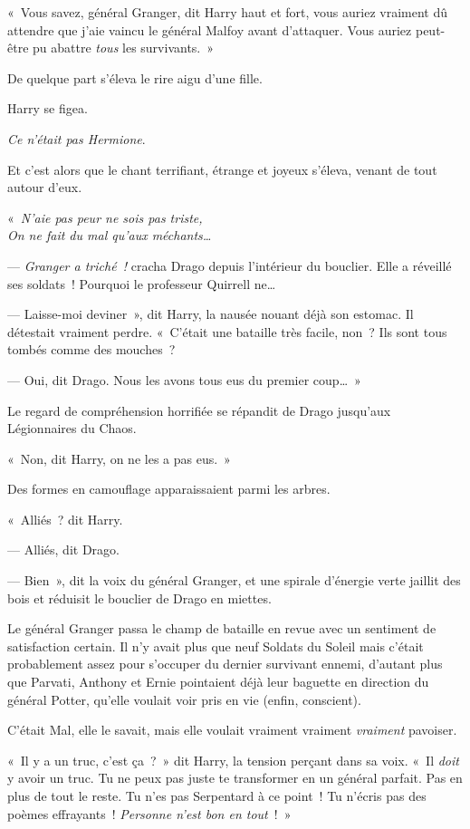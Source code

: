 «~Vous savez, général Granger, dit Harry haut et fort, vous auriez vraiment dû attendre que j'aie vaincu le général Malfoy avant d'attaquer. Vous auriez peut-être pu abattre \emph{tous} les survivants.~»

De quelque part s'éleva le rire aigu d'une fille.

Harry se figea.

\emph{Ce n'était pas Hermione}.

Et c'est alors que le chant terrifiant, étrange et joyeux s'éleva, venant de tout autour d'eux.

«~\emph{N'aie pas peur ne sois pas triste,\\ On ne fait du mal qu'aux méchants…}

--- \emph{Granger a triché~!} cracha Drago depuis l'intérieur du bouclier. Elle a réveillé ses soldats~! Pourquoi le professeur Quirrell ne…

--- Laisse-moi deviner~», dit Harry, la nausée nouant déjà son estomac. Il détestait vraiment perdre. «~C'était une bataille très facile, non~? Ils sont tous tombés comme des mouches~?

--- Oui, dit Drago. Nous les avons tous eus du premier coup…~»

Le regard de compréhension horrifiée se répandit de Drago jusqu'aux Légionnaires du Chaos.

«~Non, dit Harry, on ne les a pas eus.~»

Des formes en camouflage apparaissaient parmi les arbres.

«~Alliés~? dit Harry.

--- Alliés, dit Drago.

--- Bien~», dit la voix du général Granger, et une spirale d'énergie verte jaillit des bois et réduisit le bouclier de Drago en miettes.

\later

Le général Granger passa le champ de bataille en revue avec un sentiment de satisfaction certain. Il n'y avait plus que neuf Soldats du Soleil mais c'était probablement assez pour s'occuper du dernier survivant ennemi, d'autant plus que Parvati, Anthony et Ernie pointaient déjà leur baguette en direction du général Potter, qu'elle voulait voir pris en vie (enfin, conscient).

C'était Mal, elle le savait, mais elle voulait vraiment vraiment \emph{vraiment} pavoiser.

«~Il y a un truc, c'est ça~?~» dit Harry, la tension perçant dans sa voix. «~Il \emph{doit} y avoir un truc. Tu ne peux pas juste te transformer en un général parfait. Pas en plus de tout le reste. Tu n'es pas Serpentard à ce point~! Tu n'écris pas des poèmes effrayants~! \emph{Personne n'est bon en tout}~!~»

